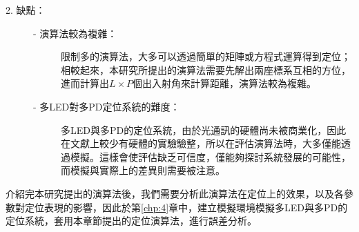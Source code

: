 \begin{description}
    \item[2. 缺點：] \hfill
    
    \begin{description}
        \item[- 演算法較為複雜：]  \hfill
        
        \qquad
        限制多的演算法，大多可以透過簡單的矩陣或方程式運算得到定位；相較起來，本研究所提出的演算法需要先解出兩座標系互相的方位，進而計算出$L\times P$個出入射角來計算距離，演算法較為複雜。

        \item[- 多LED對多PD定位系統的難度：] \hfill
        
        \qquad
        多LED與多PD的定位系統，由於光通訊的硬體尚未被商業化，因此在文獻上較少有硬體的實驗驗整，所以在評估演算法時，大多僅能透過模擬。這樣會使評估缺乏可信度，僅能夠探討系統發展的可能性，而模擬與實際上的差異則需要被注意。
    \end{description}
    
\end{description}

介紹完本研究提出的演算法後，我們需要分析此演算法在定位上的效果，以及各參數對定位表現的影響，因此於第\ref{chp:4}章中，建立模擬環境模擬多LED與多PD的定位系統，套用本章節提出的定位演算法，進行誤差分析。









